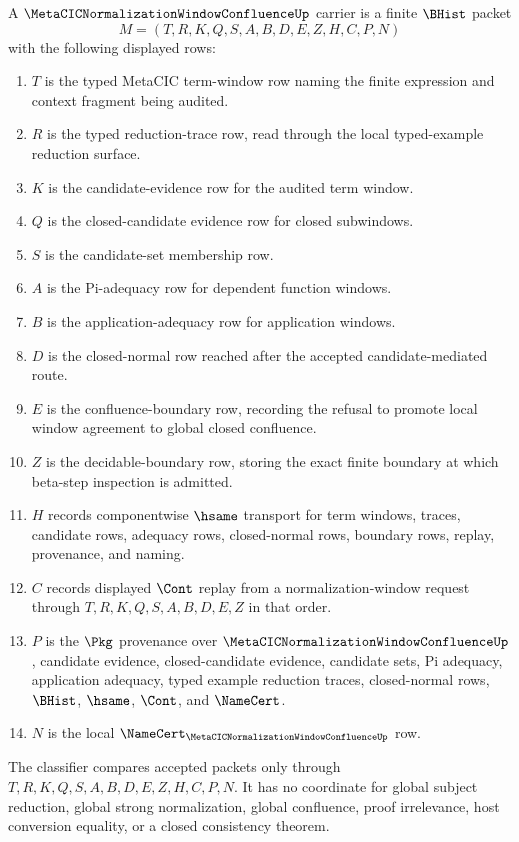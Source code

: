 \begin{definition}
\label{def:metacic-normalization-window-confluence-carrier}
A $\MetaCICNormalizationWindowConfluenceUp$ carrier is a finite $\BHist$ packet
$$
M=(T,R,K,Q,S,A,B,D,E,Z,H,C,P,N)
$$
with the following displayed rows:
\begin{enumerate}
\item $T$ is the typed MetaCIC term-window row naming the finite expression and context fragment being audited.
\item $R$ is the typed reduction-trace row, read through the local typed-example reduction surface.
\item $K$ is the candidate-evidence row for the audited term window.
\item $Q$ is the closed-candidate evidence row for closed subwindows.
\item $S$ is the candidate-set membership row.
\item $A$ is the Pi-adequacy row for dependent function windows.
\item $B$ is the application-adequacy row for application windows.
\item $D$ is the closed-normal row reached after the accepted candidate-mediated route.
\item $E$ is the confluence-boundary row, recording the refusal to promote local window agreement to global closed confluence.
\item $Z$ is the decidable-boundary row, storing the exact finite boundary at which beta-step inspection is admitted.
\item $H$ records componentwise $\hsame$ transport for term windows, traces, candidate rows, adequacy rows, closed-normal rows, boundary rows, replay, provenance, and naming.
\item $C$ records displayed $\Cont$ replay from a normalization-window request through $T,R,K,Q,S,A,B,D,E,Z$ in that order.
\item $P$ is the $\Pkg$ provenance over $\MetaCICNormalizationWindowConfluenceUp$, candidate evidence, closed-candidate evidence, candidate sets, Pi adequacy, application adequacy, typed example reduction traces, closed-normal rows, $\BHist$, $\hsame$, $\Cont$, and $\NameCert$.
\item $N$ is the local $\NameCert_{\MetaCICNormalizationWindowConfluenceUp}$ row.
\end{enumerate}
The classifier compares accepted packets only through $T,R,K,Q,S,A,B,D,E,Z,H,C,P,N$. It has no coordinate for global subject reduction, global strong normalization, global confluence, proof irrelevance, host conversion equality, or a closed consistency theorem.
\end{definition}

